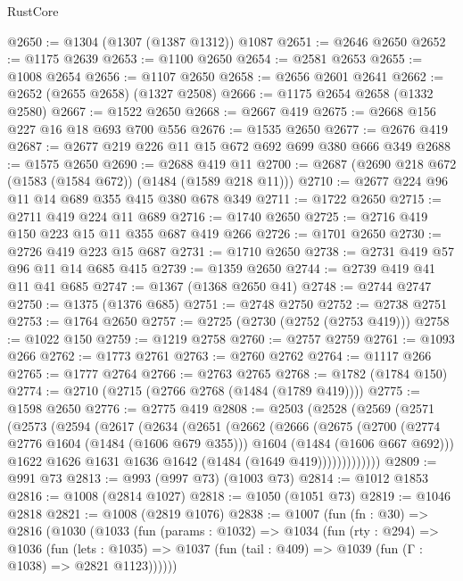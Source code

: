 \begin{lexlean}{RustCore}
\begin{coremodule}
@2650 := @1304 (@1307 (@1387 @1312)) @1087
@2651 := @2646 @2650
@2652 := @1175 @2639
@2653 := @1100 @2650
@2654 := @2581 @2653
@2655 := @1008 @2654
@2656 := @1107 @2650
@2658 := @2656 @2601 @2641
@2662 := @2652 (@2655 @2658) (@1327 @2508)
@2666 := @1175 @2654 @2658 (@1332 @2580)
@2667 := @1522 @2650
@2668 := @2667 @419
@2675 := @2668 @156 @227 @16 @18 @693 @700 @556
@2676 := @1535 @2650
@2677 := @2676 @419
@2687 := @2677 @219 @226 @11 @15 @672 @692 @699 @380 @666 @349
@2688 := @1575 @2650
@2690 := @2688 @419 @11
@2700 := @2687 (@2690 @218 @672 (@1583 (@1584 @672)) (@1484 (@1589 @218 @11)))
@2710 := @2677 @224 @96 @11 @14 @689 @355 @415 @380 @678 @349
@2711 := @1722 @2650
@2715 := @2711 @419 @224 @11 @689
@2716 := @1740 @2650
@2725 := @2716 @419 @150 @223 @15 @11 @355 @687 @419 @266
@2726 := @1701 @2650
@2730 := @2726 @419 @223 @15 @687
@2731 := @1710 @2650
@2738 := @2731 @419 @57 @96 @11 @14 @685 @415
@2739 := @1359 @2650
@2744 := @2739 @419 @41 @11 @41 @685
@2747 := @1367 (@1368 @2650 @41)
@2748 := @2744 @2747
@2750 := @1375 (@1376 @685)
@2751 := @2748 @2750
@2752 := @2738 @2751
@2753 := @1764 @2650
@2757 := @2725 (@2730 (@2752 (@2753 @419)))
@2758 := @1022 @150
@2759 := @1219 @2758
@2760 := @2757 @2759
@2761 := @1093 @266
@2762 := @1773 @2761
@2763 := @2760 @2762
@2764 := @1117 @266
@2765 := @1777 @2764
@2766 := @2763 @2765
@2768 := @1782 (@1784 @150)
@2774 := @2710 (@2715 (@2766 @2768 (@1484 (@1789 @419))))
@2775 := @1598 @2650
@2776 := @2775 @419
@2808 := @2503
    (@2528
      (@2569
        (@2571
          (@2573
            (@2594
              (@2617
                (@2634
                  (@2651
                    (@2662
                      (@2666
                        (@2675
                          (@2700
                            (@2774 @2776 @1604 (@1484 (@1606 @679 @355)))
                            @1604
                            (@1484 (@1606 @667 @692)))
                          @1622
                          @1626
                          @1631
                          @1636
                          @1642
                          (@1484 (@1649 @419)))))))))))))
@2809 := @991 @73
@2813 := @993 (@997 @73) (@1003 @73)
@2814 := @1012 @1853
@2816 := @1008 (@2814 @1027)
@2818 := @1050 (@1051 @73)
@2819 := @1046 @2818
@2821 := @1008 (@2819 @1076)
@2838 := @1007
    (fun (fn : @30) =>
    @2816
      (@1030
        (@1033
          (fun (params : @1032) =>
          @1034
            (fun (rty : @294) =>
            @1036
              (fun (lets : @1035) =>
              @1037 (fun (tail : @409) => @1039 (fun (Γ : @1038) => @2821 @1123))))))

\end{coremodule}
\end{lexlean}

